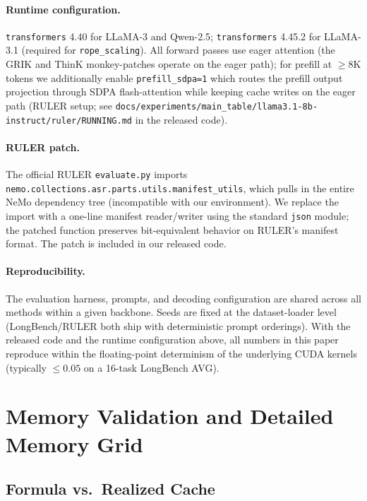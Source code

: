 \documentclass{article}
\begin{document}
\paragraph{Runtime configuration.} \texttt{transformers} 4.40 for LLaMA-3 and Qwen-2.5; \texttt{transformers} 4.45.2 for LLaMA-3.1 (required for \texttt{rope\_scaling}). All forward passes use eager attention (the GRIK and ThinK monkey-patches operate on the eager path); for prefill at $\geq 8$K tokens we additionally enable \texttt{prefill\_sdpa=1} which routes the prefill output projection through SDPA flash-attention while keeping cache writes on the eager path (RULER setup; see \texttt{docs/experiments/main\_table/llama3.1-8b-instruct/ruler/RUNNING.md} in the released code).
 
\paragraph{RULER patch.} The official RULER \texttt{evaluate.py} imports \texttt{nemo.collections.asr.parts.utils.manifest\_utils}, which pulls in the entire NeMo dependency tree (incompatible with our environment). We replace the import with a one-line manifest reader/writer using the standard \texttt{json} module; the patched function preserves bit-equivalent behavior on RULER's manifest format. The patch is included in our released code.
 
\paragraph{Reproducibility.} The evaluation harness, prompts, and decoding configuration are shared across all methods within a given backbone. Seeds are fixed at the dataset-loader level (LongBench/RULER both ship with deterministic prompt orderings). With the released code and the runtime configuration above, all numbers in this paper reproduce within the floating-point determinism of the underlying CUDA kernels (typically $\leq 0.05$ on a 16-task LongBench AVG).
 
 
\section{Memory Validation and Detailed Memory Grid}
\label{app:memory-validation}
 
\subsection{Formula vs.\ Realized Cache}
 
\end{document}
